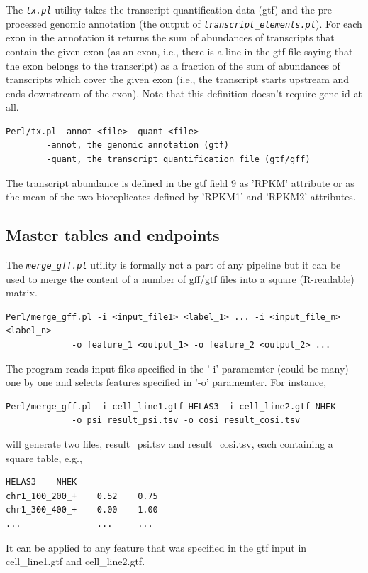 \documentclass{article}
\newcommand{\prog}[1]{{\tt\em #1}}
\begin{document}
The \prog{tx.pl} utility takes the transcript quantification data (gtf) and the pre-processed genomic annotation (the output of
\prog{transcript\_elements.pl}). For each exon in the annotation it returns the sum of abundances of transcripts that contain 
the given exon (as an exon, i.e., there is a line in the gtf file saying that the exon belongs to the transcript) as a fraction 
of the sum of abundances of transcripts which cover the given exon (i.e., the transcript starts upstream and ends downstream of the 
exon). Note that this definition doesn't require gene id at all.

\begin{verbatim}
Perl/tx.pl -annot <file> -quant <file>
        -annot, the genomic annotation (gtf)
        -quant, the transcript quantification file (gtf/gff)
\end{verbatim}

The transcript abundance is defined in the gtf field 9 as 'RPKM' attribute or as the mean of the two bioreplicates defined by
'RPKM1' and 'RPKM2' attributes.


\subsection{Master tables and endpoints}
The \prog{merge\_gff.pl} utility is formally not a part of any pipeline but it can be used to merge the content of a number of gff/gtf 
files into a square (R-readable) matrix.
\begin{verbatim}
Perl/merge_gff.pl -i <input_file1> <label_1> ... -i <input_file_n> <label_n>
             -o feature_1 <output_1> -o feature_2 <output_2> ...
\end{verbatim}
The program reads input files specified in the '-i' paramemter (could be many) one by one and selects features specified in '-o' paramemter. For instance,
\begin{verbatim}
Perl/merge_gff.pl -i cell_line1.gtf HELAS3 -i cell_line2.gtf NHEK 
             -o psi result_psi.tsv -o cosi result_cosi.tsv
\end{verbatim}
will generate two files, result\_psi.tsv and result\_cosi.tsv, each containing a square table, e.g.,
\begin{verbatim}
HELAS3    NHEK
chr1_100_200_+    0.52    0.75
chr1_300_400_+    0.00    1.00
...               ...     ...
\end{verbatim}
It can be applied to any feature that was specified in the gtf input in cell\_line1.gtf and cell\_line2.gtf.
\end{document}

